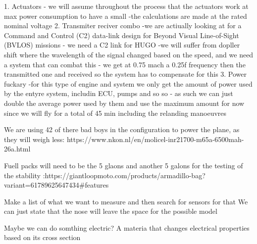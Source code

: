1. Actuators - we will assume throughout the process that the actuators work at max power consumption to have a small 
                -the calculations are made at the rated nominal voltage 
2. Transmiter reciver combo
        -we are actiually looking at for a  Command and Control (C2) data-link design for Beyond Visual Line-of-Sight (BVLOS) missions
        - we need a C2 link for HUGO
        -we will suffer from dopller shift where the wavelength of the signal changed based on the speed, and we need a system that can combat this
        - we get at 0.75 mach a 0.25f frequency then the transmitted one and received so the system has to compensate for this
3. Power fuckary
-for this type of engine and system we only get the amount of power used by the entyre system, includin ECU, pumps and so so
- as such we can just double the average power used by them and use the maximum amount for now since we will fly for a total of 45 min including the relanding manoeuvres

We are using 42 of there bad boys in the configuration to power the plane, as they will weigh less:
https://www.nkon.nl/en/molicel-inr21700-m65a-6500mah-26a.html

Fuell packs will need to be the 5 glaons and another 5 galons for the testing of the stability
:https://giantloopmoto.com/products/armadillo-bag?variant=61789625647434#features


Make a list of what we want to measure and then search for sensors for that
We can just state that the nose will leave the space for the possible model

Maybe we can do somthing electric? A materia that changes electrical properties based on its cross section